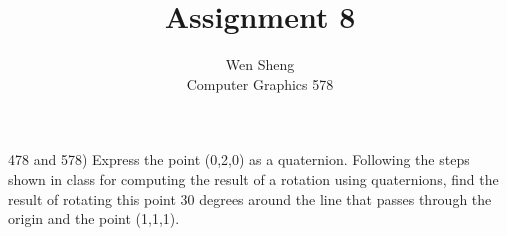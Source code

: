 \documentclass[12pt]{article}
\newenvironment{exercise}[2][Exercise]{\begin{trivlist}
\item[\hskip \labelsep {\bfseries #1}\hskip \labelsep {\bfseries #2.}]}{\end{trivlist}}
\begin{document}
 
 
 
\title{ Assignment 8}%
\author{Wen Sheng\\ %
Computer Graphics 578 } %
 
\maketitle
 
\begin{exercise}{1} %
 (478 and 578) Express the point (0,2,0) as a quaternion. Following the steps shown in class for computing the result of a rotation using quaternions, find the result of rotating this point 30 degrees around the line that passes through the origin and the point (1,1,1).
\end{exercise}
 
\end{document}
